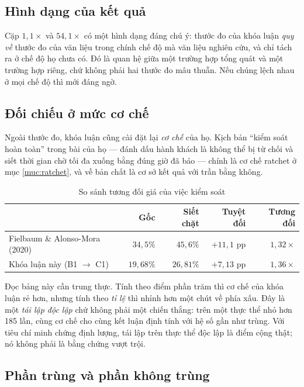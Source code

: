 \subsection{Hình dạng của kết quả}

Cặp $1{,}1\times$ và $54{,}1\times$ có một hình dạng đáng chú ý: thước đo của khóa luận
\emph{quy về} thước đo của văn liệu trong chính chế độ mà văn liệu nghiên cứu, và chỉ tách ra ở
chế độ họ chưa có. Đó là quan hệ giữa một trường hợp tổng quát và một trường hợp riêng, chứ
không phải hai thước đo mâu thuẫn. Nếu chúng lệch nhau ở mọi chế độ thì mới đáng ngờ.

\subsection{Đối chiếu ở mức cơ chế}

Ngoài thước đo, khóa luận cũng cài đặt lại \emph{cơ chế} của họ. Kịch bản ``kiểm soát hoàn
toàn'' trong bài của họ --- đánh dấu hành khách là không thể bị từ chối và siết thời gian chờ
tối đa xuống bằng đúng giờ đã báo --- chính là cơ chế ratchet ở mục \ref{muc:ratchet}, và về bản chất là cơ
sở kết quả với trần bằng không.

\begin{table}[htbp]
\centering
\caption{So sánh tương đối giá của việc kiểm soát}
\label{bang:sosanh-tuongdoi}
\small
\begin{tabular}{@{}lrrrr@{}}
\toprule
& \textbf{Gốc} & \textbf{Siết chặt} & \textbf{Tuyệt đối} & \textbf{Tương đối}\\
\midrule
Fielbaum \& Alonso-Mora (2020) & $34{,}5\%$ & $45{,}6\%$ & $+11{,}1$ pp & $1{,}32\times$\\
Khóa luận này (B1 $\to$ C1) & $19{,}68\%$ & $26{,}81\%$ & $+7{,}13$ pp & $1{,}36\times$\\
\bottomrule
\end{tabular}
\end{table}

Đọc bảng này cần trung thực. Tính theo điểm phần trăm thì cơ chế của khóa luận rẻ hơn, nhưng
tính theo \emph{tỉ lệ} thì nhỉnh hơn một chút về phía xấu. Đây là một \emph{tái lập độc lập}
chứ không phải một chiến thắng: trên một thực thể nhỏ hơn 185 lần, cùng cơ chế cho cùng kết luận
định tính với hệ số gần như trùng. Với tiêu chí minh chứng định lượng, tái lập trên thực thể độc
lập là điểm cộng thật; nó không phải là bằng chứng vượt trội.

\subsection{Phần trùng và phần không trùng}

